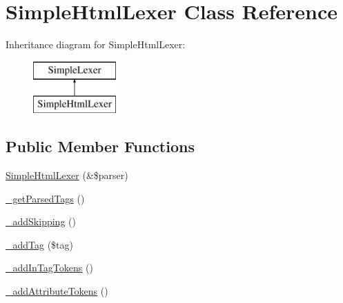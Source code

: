 \hypertarget{class_simple_html_lexer}{
\section{SimpleHtmlLexer Class Reference}
\label{class_simple_html_lexer}
}
Inheritance diagram for SimpleHtmlLexer:\begin{figure}[H]
\begin{center}
\leavevmode
\includegraphics[height=2.000000cm]{class_simple_html_lexer}
\end{center}
\end{figure}
\subsection*{Public Member Functions}
\begin{DoxyCompactItemize}
\item 
\hyperlink{class_simple_html_lexer_a75484f1b502fb907157326938b7709c6}{SimpleHtmlLexer} (\&\$parser)
\item 
\hyperlink{class_simple_html_lexer_aa52514ac1aa91a058c2aba5f8c5ee42e}{\_\-getParsedTags} ()
\item 
\hyperlink{class_simple_html_lexer_ab79435c67c062d6ac87e977cf69f4079}{\_\-addSkipping} ()
\item 
\hyperlink{class_simple_html_lexer_a75ea520f6f309214e4dbd26579ef8e41}{\_\-addTag} (\$tag)
\item 
\hyperlink{class_simple_html_lexer_a1a2cb51b90abd02362c71ce93f220e58}{\_\-addInTagTokens} ()
\item 
\hyperlink{class_simple_html_lexer_a4cd292408994d7af7c2610f3c95798ca}{\_\-addAttributeTokens} ()
\end{DoxyCompactItemize}


